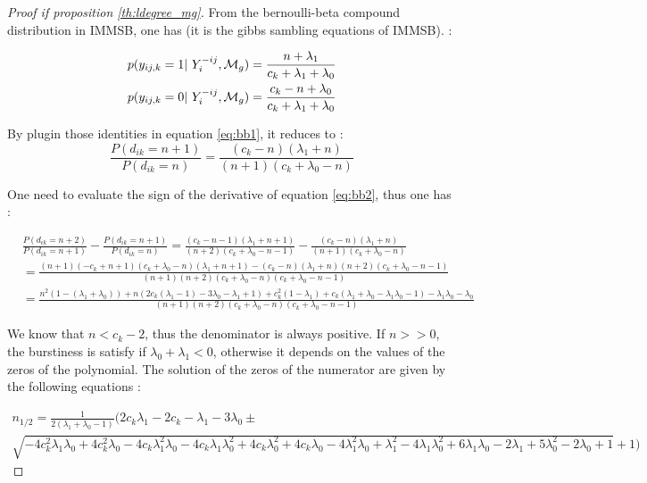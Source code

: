 \begin{proof}[Proof if proposition \ref{th:ldegree_mg}]
From the bernoulli-beta compound distribution in IMMSB, one has (it is the
gibbs sambling equations of IMMSB). : 

\begin{align}
    p(y_{ij,k}=1 | Y_i^{-ij}, \M_g) = \frac{n+ \lambda_1}{c_k + \lambda_1 + \lambda_0}\\
    p(y_{ij,k}=0 | Y_i^{-ij}, \M_g) = \frac{c_k - n + \lambda_0}{c_k + \lambda_1 + \lambda_0}
\end{align}

By plugin those identities in equation \eqref{eq:bb1}, it reduces to :
\begin{equation} \label{eq:bb2}
    \frac{P(d_{ik} = n+1)}{P(d_{ik} = n)} = \frac{\left(c_k - n\right) \left(\lambda_1
    + n\right)}{\left(n + 1\right) \left(c_k + \lambda_0 - n\right)}
\end{equation}


One need to evaluate the sign of the derivative of equation \eqref{eq:bb2}, thus one has :

\begin{align}
    &\frac{P(d_{ik} = n+2)}{P(d_{ik} = n+1)} - \frac{P(d_{ik} = n+1)}{P(d_{ik} = n)}
    = \frac{\left(c_k - n - 1\right) \left(\lambda_1 + n + 1\right)}{\left(n + 2\right) \left(c_k
    + \lambda_0 - n - 1\right)} - \frac{\left(c_k - n\right) \left(\lambda_1
    + n\right)}{\left(n + 1\right) \left(c_k + \lambda_0 - n\right)} \\
    &= \frac{ \left(n + 1\right) \left(- c_k + n + 1\right) \left(c_k
    + \lambda_0 - n\right) \left(\lambda_1 + n + 1\right) - \left(c_k - n\right) \left(\lambda_1 + n\right) \left(n + 2\right) \left(c_k
    + \lambda_0 - n - 1\right)}{\left(n + 1\right) \left(n
    + 2\right) \left(c_k + \lambda_0 - n\right) \left(c_k + \lambda_0 - n - 1\right)} \\
    &= \frac{n^2(1-(\lambda_1+\lambda_0))+n(2c_k(\lambda_1-1)-3\lambda_0-\lambda_1+1)+c_k^2(1-\lambda_1)+c_k(\lambda_1+\lambda_0-\lambda_1\lambda_0-1)-\lambda_1\lambda_0-\lambda_0}{\left(n + 1\right) \left(n + 2\right) \left(c_k + \lambda_0 - n\right) \left(c_k + \lambda_0 - n - 1\right)}
\end{align}

We know that $n < c_k -2$, thus the denominator is always positive. If $n >> 0$, the
burstiness is satisfy if $\lambda_0+\lambda_1 < 0$, otherwise it depends on the values of
the zeros of the polynomial. The solution of the zeros of the numerator are given by the following equations : 

\begin{multline} \label{eq:sqrt1}
n_{1/2} =  \frac{1}{2 \left(\lambda_1 + \lambda_0 - 1\right)} \biggl(2 c_k \lambda_1
    - 2 c_k - \lambda_1 - 3 \lambda_0 \pm \\
\sqrt{- 4 c_k^{2} \lambda_1 \lambda_0 + 4 c_k^{2} \lambda_0 - 4 c_k \lambda_1^{2}
    \lambda_0 - 4 c_k \lambda_1 \lambda_0^{2} + 4 c_k \lambda_0^{2} + 4 c_k \lambda_0
    - 4 \lambda_1^{2} \lambda_0 + \lambda_1^{2} - 4 \lambda_1 \lambda_0^{2} + 6 \lambda_1
    \lambda_0 - 2 \lambda_1 + 5 \lambda_0^{2} - 2 \lambda_0 + 1} + 1\biggr) 
\end{multline}


\end{proof}
